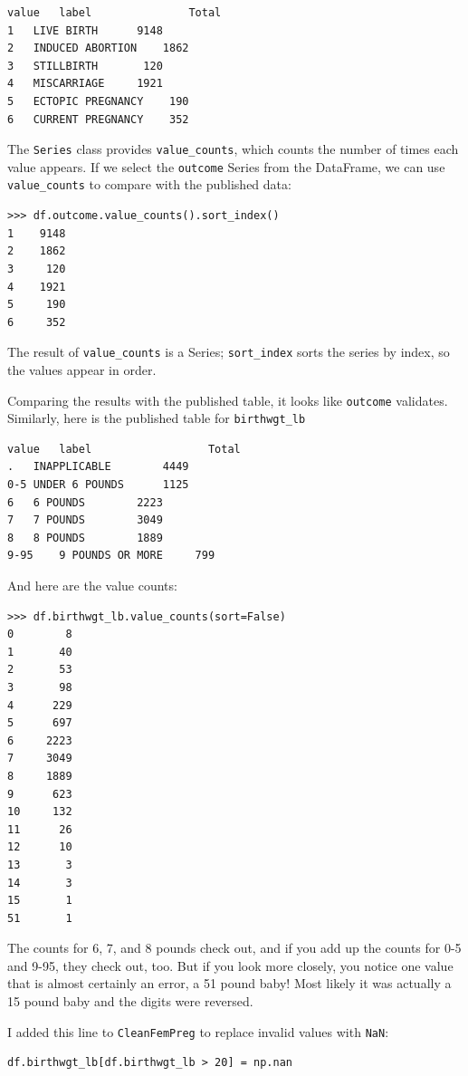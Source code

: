 \documentclass[12pt]{book}
\begin{document}
\begin{verbatim}
value	label	 	        Total
1	LIVE BIRTH	 	9148
2	INDUCED ABORTION	1862
3	STILLBIRTH	 	 120
4	MISCARRIAGE	 	1921
5	ECTOPIC PREGNANCY	 190
6	CURRENT PREGNANCY	 352
\end{verbatim}

The {\tt Series} class provides \verb"value_counts", which
counts the number of times each value appears.  If we select
the {\tt outcome} Series from the DataFrame, we can use
\verb"value_counts" to compare with the published data:

\begin{verbatim}
>>> df.outcome.value_counts().sort_index()
1    9148
2    1862
3     120
4    1921
5     190
6     352
\end{verbatim}

The result of \verb"value_counts" is a Series;
\verb"sort_index" sorts the series by index, so the
values appear in order.

Comparing the results with the published table, it looks like
{\tt outcome} validates.  Similarly, here is the published table for
\verb"birthwgt_lb"

\begin{verbatim}
value	label                  Total
.	INAPPLICABLE	 	4449
0-5	UNDER 6 POUNDS	 	1125
6	6 POUNDS	 	2223
7	7 POUNDS	 	3049
8	8 POUNDS	 	1889
9-95	9 POUNDS OR MORE	 799
\end{verbatim}

And here are the value counts:

\begin{verbatim}
>>> df.birthwgt_lb.value_counts(sort=False)
0        8
1       40
2       53
3       98
4      229
5      697
6     2223
7     3049
8     1889
9      623
10     132
11      26
12      10
13       3
14       3
15       1
51       1
\end{verbatim}

The counts for 6, 7, and 8 pounds check out, and if you add
up the counts for 0-5 and 9-95, they check out, too.  But
if you look more closely, you notice one value that is almost
certainly an error, a 51 pound baby!  Most likely it was actually
a 15 pound baby and the digits were reversed.

I added this line to {\tt CleanFemPreg} to replace invalid values
with {\tt NaN}:

\begin{verbatim}
df.birthwgt_lb[df.birthwgt_lb > 20] = np.nan
\end{verbatim}
\end{document}

